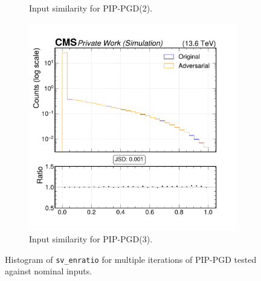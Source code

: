 \begin{figure}[h]
\begin{subfigure}[t]{0.32\textwidth}
    \caption*{Input similarity for PIP-PGD(2).}
  \end{subfigure}\hfill
  \begin{subfigure}[t]{0.32\textwidth}
    \includegraphics[width=\linewidth]{media/output/features/compare/combined_it_3/cmp_vtx_arr_sv_enratio.pdf}
    \caption*{Input similarity for PIP-PGD(3).}
  \end{subfigure}

  \caption*{Histogram of \texttt{sv\_enratio} for multiple iterations of PIP-PGD tested against nominal inputs.}
  \label{fig:combined_input_sv_enratio}
\end{figure}

